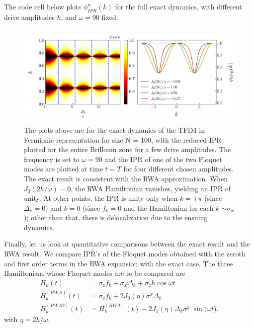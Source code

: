 \documentclass{article}
\begin{document}
The code cell below plots $\phi^n_{IPR}(k)$ for the full exact dynamics, with different drive amplitudes $h$, and $\omega = 90$ fixed.


\begin{figure}[]
\centering
\includegraphics[height = 5cm, width = 12cm]{ising_exact_ipr.jpeg}
\caption{The plots above are for the exact dynamics of the TFIM in Fermionic representation for size N = 100, with the reduced IPR plotted for the entire Brillouin zone for a few drive amplitudes. The frequency is set to $\omega = 90$ and the IPR of one of the two Floquet modes are plotted at time $t=T$ for four different chosen amplitudes. The exact result is consistent with the RWA approximation. When $J_0(2h/\omega) = 0$, the RWA Hamiltonian vanishes, yielding an IPR of unity. At other points, the IPR is unity only when $k=\pm \pi$ (since $\Delta_k=0$) and $k=0$ (since $f_k = 0$ and the Hamiltonian for each $k$ $\sim \sigma_x$); other than that, there is delocalization due to the ensuing dynamics.}
\end{figure}

Finally, let us look at quantitative comparisons between the exact result and the RWA result.  We compare IPR's of the Floquet modes obtained with the zeroth and first order terms in the RWA expansion with the exact case. The three Hamiltonians whose Floquet modes are to be compared are
\begin{align*}
H_k(t) &= \sigma_z f_k + \sigma_x \Delta_k + \sigma_z h\cos{\omega t}\\
H^{(RWA)}_k(t) &= \sigma_z f_k + 2 J_0(\eta) \sigma^x \Delta_k\\
H^{(RWA2)}_k(t) &= H^{(RWA)}_k(t) - 2 J_1(\eta)\Delta_k \sigma^y\;\sin{\big(\omega t\big)}. 
\end{align*}
with $\eta=2 h/\omega$. 
\end{document}

